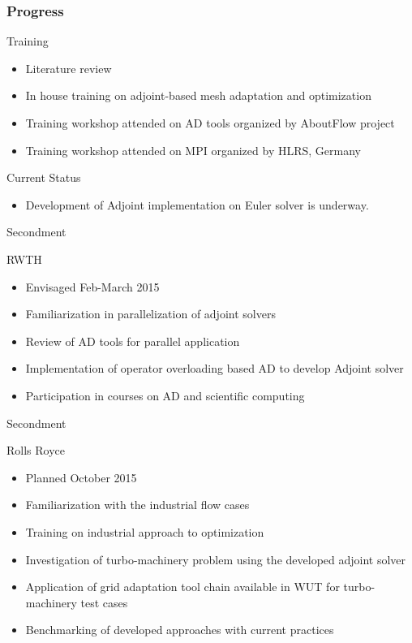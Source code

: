 \begin{frame}
\frametitle{Progress}
	\begin{block}{Training}
		\begin{itemize}
			\item Literature review
			\item In house training on adjoint-based mesh adaptation and optimization
			\item Training workshop attended on AD tools organized by AboutFlow project
			\item Training workshop attended on MPI organized by HLRS, Germany
		\end{itemize}
	\end{block}
	\begin{block}{Current Status}
		\begin{itemize}
			\item Development of Adjoint implementation on Euler solver is underway.
		\end{itemize}	
	\end{block}
\end{frame}

\begin{frame}{Secondment}

\begin{block}{RWTH}
\begin{itemize}
\item Envisaged Feb-March 2015
\item Familiarization in parallelization of adjoint solvers
\item Review of AD tools for parallel application
\item Implementation of operator overloading based AD to develop Adjoint solver 
\item Participation in courses on AD and scientific computing
\end{itemize}
\end{block}
\end{frame}
\begin{frame}{Secondment}
\begin{block}{Rolls Royce}
\begin{itemize}
\item Planned October 2015
\item Familiarization with the industrial flow cases
\item Training on industrial approach to optimization
\item Investigation of turbo-machinery problem using the developed adjoint solver 
\item Application of grid adaptation tool chain available in WUT for turbo-machinery test cases
\item Benchmarking of developed approaches with current practices
\end{itemize}
\end{block}
\end{frame}

